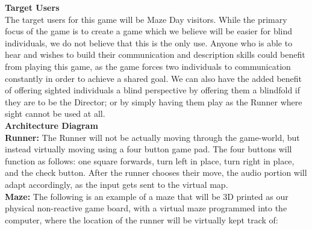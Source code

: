 \documentclass[12pt]{article}
\begin{document}
\textbf{\large Target Users}\\
\indent The target users for this game will be Maze Day visitors.  While the primary focus of the game is to create a game which we believe will be easier for blind individuals, we do not believe that this is the only use.  Anyone who is able to hear and wishes to build their communication and description skills could benefit from playing this game, as the game forces two individuals to communication constantly in order to achieve a shared goal.  We can also have the added benefit of offering sighted individuals a blind perspective by offering them a blindfold if they are to be the Director; or by simply having them play as the Runner where sight cannot be used at all.\\

\textbf{\large Architecture Diagram}\\
\indent \textbf{Runner:} The Runner will not be actually moving through the game-world, but instead virtually moving using a four button game pad. The four buttons will function as follows: one square forwards, turn left in place, turn right in place, and the check button. After the runner chooses their move, the audio portion will adapt accordingly, as the input gets sent to the virtual map.\\
\indent \textbf{Maze:} The following is an example of a maze that will be 3D printed as our physical non-reactive game board, with a virtual maze programmed into the computer, where the location of the runner will be virtually kept track of:
\newpage
\begin{figure}[ht]
\end{figure}
\end{document}
